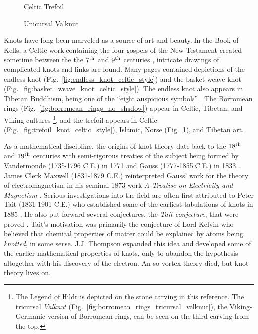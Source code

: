 \begin{figure}
    \centering
    \begin{minipage}[b]{0.49\textwidth}
        \centering
        \caption{Celtic Trefoil}
        \label{fig:trefoil_knot_celtic_style}
    \end{minipage}
    \begin{minipage}[b]{0.49\textwidth}
        \centering
        \caption{Unicursal Valknut}
        \label{fig:trefoil_unicursal_valknut}
    \end{minipage}
\end{figure}
Knots have long been marveled as a source of art and beauty. In the Book of
Kells, a Celtic work containing the four gospels of the New Testament created
sometime between the the $7^{\small\textrm{th}}$ and $9^{\small\textrm{th}}$
centuries \cite[p.~108]{Nordenfalk1977}, intricate drawings of complicated
knots and links are found. Many pages contained depictions of the endless knot
(Fig.~\ref{fig:endless_knot_celtic_style}) and the basket weave knot
(Fig.~\ref{fig:basket_weave_knot_celtic_style}). The endless knot also appears
in Tibetan Buddhism, being one of the ``eight auspicious symbols''
\cite[p.~11]{BeerTibetanSymbols}. The Borromean rings
(Fig.~\ref{fig:borromean_rings_no_shadow}) appear in Celtic, Tibetan,
and Viking cultures
\cite[p.~129]{VikingWomenJesch}%
\footnote{%
    The Legend of Hildr is depicted on the stone carving in this
    reference. The tricursal \textit{Valknut}
    (Fig.~\ref{fig:borromean_rings_tricursal_valknut}),
    the Viking-Germanic version of Borromean rings,
    can be seen on the third carving from the top.
},
and the trefoil appears in Celtic (Fig.~\ref{fig:trefoil_knot_celtic_style}),
Islamic, Norse (Fig.~\ref{fig:trefoil_unicursal_valknut}), and Tibetan art.
\par\hfill\par
As a mathematical discipline, the origins of knot theory
date back to the $18^{\small\textrm{th}}$ and
$19^{\small\textrm{th}}$ centuries with semi-rigorous treaties of
the subject being formed by Vandermonde (1735-1796 C.E.) in 1771
\cite{Vanermonde1771} and Gauss
(1777-1855 C.E.) in 1833 \cite[p.~1327]{RiccaNipotaGaussLinkingNumber}.
James Clerk Maxwell (1831-1879 C.E.) reinterpreted Gauss' work for the theory
of electromagnetism in his seminal 1873 work
\textit{A Treatise on Electricity and Magnetism}
\cite{MaxwellTreatist1873}.
Serious investigations into the field are often first attributed to Peter Tait
(1831-1901 C.E.) who established some of the earliest tabulations of knots
in 1885 \cite{TaitOnKnots1885}. He also put forward several conjectures,
the \textit{Tait conjecture}, that were proved . Tait's motivation was
primarily the conjecture of Lord Kelvin who believed that chemical properties
of matter could be explained by atoms being \textit{knotted}, in some sense.
J.J. Thompson expanded this idea and developed some of the earlier mathematical
properties of knots, only to abandon the hypothesis altogether with his
discovery of the electron. An so vortex theory died, but knot theory lives on.
